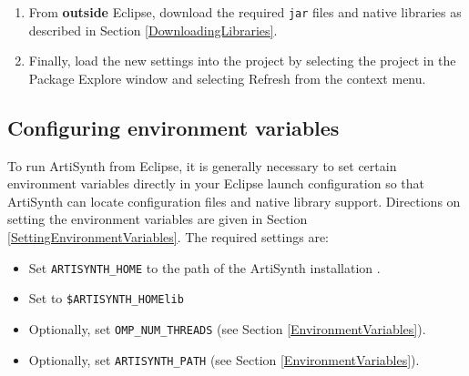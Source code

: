 \begin{enumerate}
\ifMacOS
\begin{sideblock}
{\bf Attention MacOS users:}\\[0.5em]
The default zip utility on MacOS will create a new sub-folder called 
{\tt eclipseSettings} and will extract the files there.  
\emph{You do not want this!!}
Some of the files are then labelled as ``hidden'' by MacOS, which will
prevent you from moving them to the correct place manually. 
Either extract the file directly to the {\tt\$ARTISYNTH\_HOME} directory 
with a more standard application like {-Zip} ({\sf 7zX} for OSX), 
or use the {\tt unzip} utility from the command-line. For the latter,
open a terminal window, change to the ArtiSynth install directory,
enter the command
\begin{verbatim}
  unzip support/eclipse/eclipseSettings.zip
\end{verbatim}
and respond with {\tt y} when asked if it is OK to replace {\tt .project}.
\end{sideblock}
\fi

\item From {\bf outside} Eclipse, download
the required {\tt jar}
files and native libraries as described in Section \ref{DownloadingLibraries}.

\item Finally, load the new settings into the project by selecting the
project in the {\sf Package Explore} window and selecting {\sf
Refresh} from the context menu.

\end{enumerate}

\subsection{Configuring environment variables}
\label{EclipseEnvironmentVariables}

To run ArtiSynth from Eclipse, it is generally necessary to set certain
environment variables directly in your Eclipse launch configuration so
that ArtiSynth can locate configuration files and native library
support. Directions on setting the environment variables are given
in Section \ref{SettingEnvironmentVariables}. The required
settings are:

\begin{itemize}

\item Set {\tt ARTISYNTH\_HOME} to the path of the ArtiSynth
installation \directory.

\ifNeedLibraryPath
\item Set {\tt \LIBRARYPATH} to {\tt \$ARTISYNTH\_HOME\SEP lib\SEP \ARCH}
\fi

\item Optionally, set {\tt OMP\_NUM\_THREADS} (see Section
\ref{EnvironmentVariables}).

\item Optionally, set {\tt ARTISYNTH\_PATH} 
(see Section \ref{EnvironmentVariables}).

\end{itemize}

